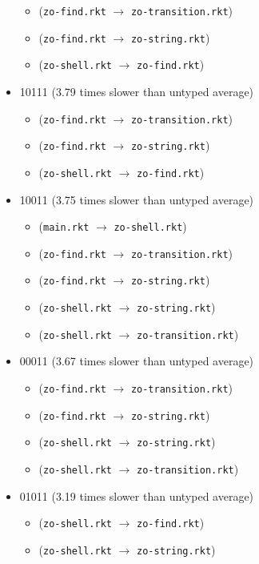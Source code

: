 \documentclass{article}
\newcommand{\mono}[1]{\texttt{#1}}
\begin{document}
\begin{itemize}
\begin{itemize}
  \item (\mono{zo-find.rkt} $\rightarrow$ \mono{zo-transition.rkt})
  \item (\mono{zo-find.rkt} $\rightarrow$ \mono{zo-string.rkt})
  \item (\mono{zo-shell.rkt} $\rightarrow$ \mono{zo-find.rkt})
  \end{itemize}
\item 10111 (3.79 times slower than untyped average)
  \begin{itemize}
  \item (\mono{zo-find.rkt} $\rightarrow$ \mono{zo-transition.rkt})
  \item (\mono{zo-find.rkt} $\rightarrow$ \mono{zo-string.rkt})
  \item (\mono{zo-shell.rkt} $\rightarrow$ \mono{zo-find.rkt})
  \end{itemize}
\item 10011 (3.75 times slower than untyped average)
  \begin{itemize}
  \item (\mono{main.rkt} $\rightarrow$ \mono{zo-shell.rkt})
  \item (\mono{zo-find.rkt} $\rightarrow$ \mono{zo-transition.rkt})
  \item (\mono{zo-find.rkt} $\rightarrow$ \mono{zo-string.rkt})
  \item (\mono{zo-shell.rkt} $\rightarrow$ \mono{zo-string.rkt})
  \item (\mono{zo-shell.rkt} $\rightarrow$ \mono{zo-transition.rkt})
  \end{itemize}
\item 00011 (3.67 times slower than untyped average)
  \begin{itemize}
  \item (\mono{zo-find.rkt} $\rightarrow$ \mono{zo-transition.rkt})
  \item (\mono{zo-find.rkt} $\rightarrow$ \mono{zo-string.rkt})
  \item (\mono{zo-shell.rkt} $\rightarrow$ \mono{zo-string.rkt})
  \item (\mono{zo-shell.rkt} $\rightarrow$ \mono{zo-transition.rkt})
  \end{itemize}
\item 01011 (3.19 times slower than untyped average)
  \begin{itemize}
  \item (\mono{zo-shell.rkt} $\rightarrow$ \mono{zo-find.rkt})
  \item (\mono{zo-shell.rkt} $\rightarrow$ \mono{zo-string.rkt})

\end{itemize}
\end{itemize}
\end{document}
